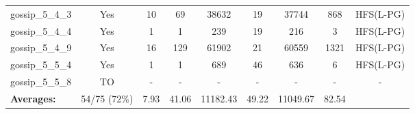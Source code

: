 \documentclass{article}
\begin{document}
\begin{tabular}{lcccccccc}
gossip\_5\_4\_3 & Yes & 10 & 69 & 38632 & 19 & 37744 & 868 & HFS(L-PG) \\
gossip\_5\_4\_4 & Yes & 1 & 1 & 239 & 19 & 216 & 3 & HFS(L-PG) \\
gossip\_5\_4\_9 & Yes & 16 & 129 & 61902 & 21 & 60559 & 1321 & HFS(L-PG) \\
gossip\_5\_5\_4 & Yes & 1 & 1 & 689 & 46 & 636 & 6 & HFS(L-PG) \\
gossip\_5\_5\_8 & TO & - & - & - & - & - & - & - \\
\textbf{Averages:} & 54/75 (72\%) & 7.93 & 41.06 & 11182.43 & 49.22 & 11049.67 & 82.54 & \\
\bottomrule
\end{tabular}
\\[0.7cm]
\end{document}

